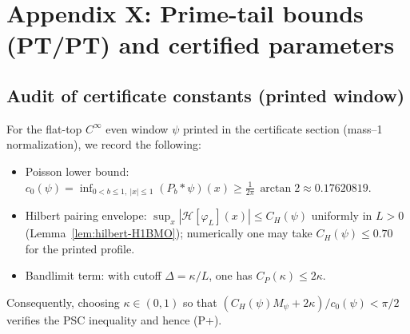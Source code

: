 \documentclass[11pt]{article}
\theoremstyle{definition}
\theoremstyle{remark}
\begin{document}
\section*{Appendix X: Prime-tail bounds (PT/PT) and certified parameters}
\subsection*{Audit of certificate constants (printed window)}
For the flat-top $C^\infty$ even window $\psi$ printed in the certificate section (mass--1 normalization), we record the following:
\begin{itemize}
 \item Poisson lower bound: $\displaystyle c_0(\psi)=\inf_{0<b\le1,\ |x|\le1}(P_b*\psi)(x)\ge \tfrac{1}{2\pi}\,\arctan 2\approx 0.17620819$.
 \item Hilbert pairing envelope: $\displaystyle \sup_x|\mathcal H[\varphi_L](x)|\le C_H(\psi)$ uniformly in $L>0$ (Lemma~\ref{lem:hilbert-H1BMO}); numerically one may take $C_H(\psi)\le 0.70$ for the printed profile.
 \item Bandlimit term: with cutoff $\Delta=\kappa/L$, one has $C_P(\kappa)\le 2\kappa$.
\end{itemize}
Consequently, choosing $\kappa\in(0,1)$ so that $(C_H(\psi)M_\psi+2\kappa)/c_0(\psi)<\pi/2$ verifies the PSC inequality and hence (P+).
\end{document}
